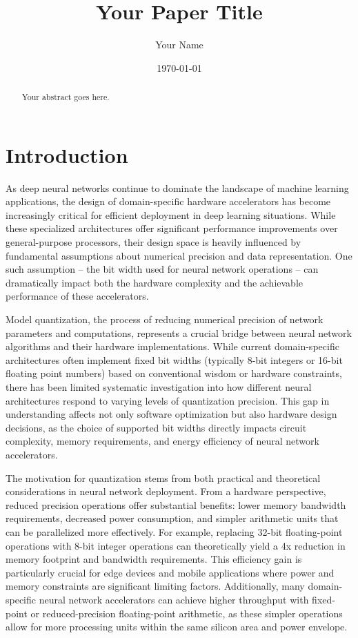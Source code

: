 \documentclass[twocolumn]{article}
\title{Your Paper Title}
\author{Your Name}
\date{\today}
\begin{document}
\maketitle

\begin{abstract}
Your abstract goes here.
\end{abstract}

\section{Introduction}
As deep neural networks continue to dominate the landscape of machine learning
applications, the design of domain-specific hardware accelerators has become
increasingly critical for efficient deployment in deep learning situations.
While these specialized architectures offer significant performance improvements
over general-purpose processors, their design space is heavily influenced by
fundamental assumptions about numerical precision and data representation. One
such assumption -- the bit width used for neural network operations -- can
dramatically impact both the hardware complexity and the achievable performance
of these accelerators.

Model quantization, the process of reducing numerical precision of network
parameters and computations, represents a crucial bridge between neural network
algorithms and their hardware implementations. While current domain-specific
architectures often implement fixed bit widths (typically 8-bit integers or
16-bit floating point numbers) based on conventional wisdom or hardware
constraints, there has been limited systematic investigation into how different
neural architectures respond to varying levels of quantization precision. This
gap in understanding affects not only software optimization but also hardware
design decisions, as the choice of supported bit widths directly impacts circuit
complexity, memory requirements, and energy efficiency of neural network
accelerators.

The motivation for quantization stems from both practical and theoretical
considerations in neural network deployment. From a hardware perspective,
reduced precision operations offer substantial benefits: lower memory bandwidth
requirements, decreased power consumption, and simpler arithmetic units that can
be parallelized more effectively. For example, replacing 32-bit floating-point
operations with 8-bit integer operations can theoretically yield a 4x reduction
in memory footprint and bandwidth requirements. This efficiency gain is
particularly crucial for edge devices and mobile applications where power and
memory constraints are significant limiting factors. Additionally, many
domain-specific neural network accelerators can achieve higher throughput with
fixed-point or reduced-precision floating-point arithmetic, as these simpler
operations allow for more processing units within the same silicon area and
power envelope.
\end{document}
